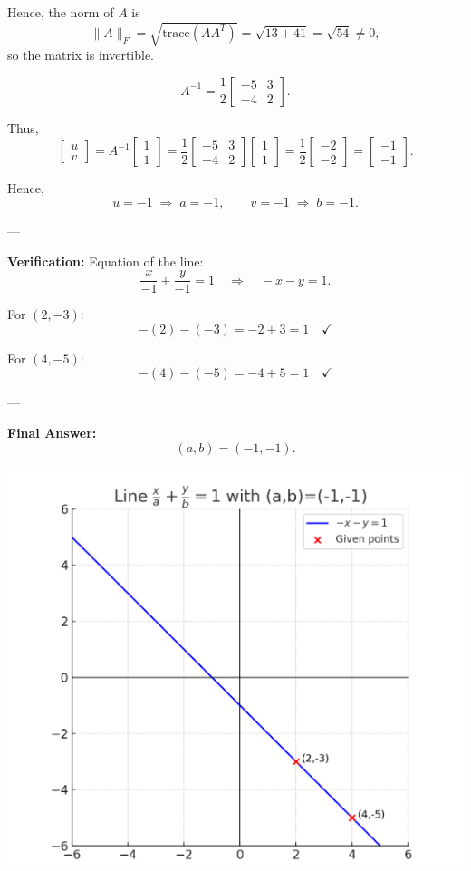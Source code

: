 \documentclass[journal]{IEEEtran}
\begin{document}
Hence, the norm of $A$ is
\[
\|A\|_F = \sqrt{\mathrm{trace}(A A^T)} = \sqrt{13 + 41} = \sqrt{54} \neq 0,
\]
so the matrix is invertible.


\[
A^{-1} = \frac{1}{2}
\begin{bmatrix}
-5 & 3 \\
-4 & 2
\end{bmatrix}.
\]

Thus,
\[
\begin{bmatrix}
u \\ v
\end{bmatrix}
=
A^{-1}
\begin{bmatrix}
1 \\ 1
\end{bmatrix}
=
\frac{1}{2}
\begin{bmatrix}
-5 & 3 \\
-4 & 2
\end{bmatrix}
\begin{bmatrix}
1 \\ 1
\end{bmatrix}
=
\frac{1}{2}
\begin{bmatrix}
-2 \\ -2
\end{bmatrix}
=
\begin{bmatrix}
-1 \\ -1
\end{bmatrix}.
\]

Hence,
\[
u = -1 \;\Rightarrow\; a = -1, 
\qquad 
v = -1 \;\Rightarrow\; b = -1.
\]

---

\textbf{Verification:}  
Equation of the line:
\[
\frac{x}{-1} + \frac{y}{-1} = 1 \quad \Rightarrow \quad -x - y = 1.
\]

For $(2,-3)$:
\[
-(2) - (-3) = -2 + 3 = 1 \quad \checkmark
\]

For $(4,-5)$:
\[
-(4) - (-5) = -4 + 5 = 1 \quad \checkmark
\]

---

\textbf{Final Answer:}  
\[
(a,b) = (-1,-1).
\]

\begin{center}
    \includegraphics[width=0.8\columnwidth]{figs/plot6.png}
\end{center}
\end{document}
